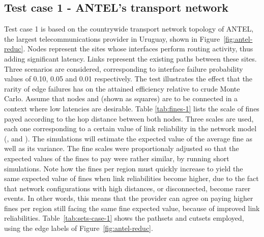 \documentclass[a4paper]{article}
\begin{document}
\subsection{Test case 1 - ANTEL's transport network}

Test case 1 is based on the countrywide transport network topology of ANTEL, the largest telecommunications provider in Uruguay, shown in Figure~\ref{fig:antel-reduc}. Nodes represent the sites whose interfaces perform routing activity, thus adding significant latency. Links represent the existing paths between these sites. Three scenarios are considered, corresponding to interface failure probability values of 0.10, 0.05 and 0.01 respectively. The test illustrates the effect that the rarity of edge failures has on the attained efficiency relative to crude Monte Carlo. Assume that nodes  and  (shown as squares) are to be connected in a context where low latencies are desirable. Table \ref{tab:fines-1} lists the scale of fines payed according to the hop distance between both nodes. Three scales are used, each one corresponding to a certain value of link reliability in the network model (,  and ). The simulations will estimate the expected value of the average fine as well as its variance. The fine scales were proportionaly adjusted so that the expected values of the fines to pay were rather similar, by running short simulations. Note how the fines per region must quickly increase to yield the same expected value of fines when link reliabilities become higher, due to the fact that network configurations with high distances, or disconnected, become rarer events. In other words, this means that the provider can agree on paying higher fines per region still facing the same fine expected value, because of improved link reliabilities. Table~\ref{tab:sets-case-1} shows the pathsets and cutsets employed, using the edge labels of Figure~\ref{fig:antel-reduc}.
\end{document}
